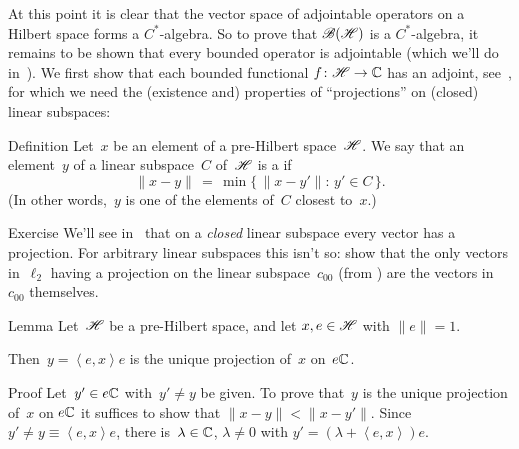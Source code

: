 \documentclass[a]{subfiles}
\begin{document}
\begin{parsec}%
\begin{point}%
At this point
it is clear that the vector space of adjointable operators
on a Hilbert space forms a $C^*$-algebra.
So to prove that $\mathscr{B}(\mathscr{H})$
is a $C^*$-algebra,
it remains to be shown that every bounded operator
is adjointable (which we'll do in~).
We first show that each bounded functional $f\colon \mathscr{H}\to \mathbb{C}$
has an adjoint, see~,
for which we need the (existence and) properties of ``projections''
on (closed) linear subspaces:
\end{point}
\begin{point}{Definition}
Let~$x$ be an element of a pre-Hilbert space~$\mathscr{H}$.
We say that an element~$y$ of a linear subspace~$C$
of~$\mathscr{H}$ is a 
if
\begin{equation*}
\|x-y\|\,=\,\min\{\,\|x-y'\|\colon \,y'\in C\,\}.
\end{equation*}
(In other words,~$y$ is one of the elements of~$C$ closest to~$x$.)
\end{point}
\begin{point}{Exercise}%
We'll see in~
that on a \emph{closed}
linear subspace
every vector has a projection.
For arbitrary linear subspaces this
isn't so:
show that the only vectors in~$\ell_2$
having 
a projection on the linear subspace~$c_{00}$
(from )
are the vectors in~$c_{00}$ themselves.
\end{point}
\begin{point}{Lemma}%
Let~$\mathscr{H}$ be a pre-Hilbert space,
and let $x,e\in\mathscr{H}$ with
$\|e\|=1$.

Then~$y=\left<e,x\right>e$ is the unique projection of~$x$ on~$e\mathbb{C}$.
\begin{point}{Proof}%
Let~$y'\in e\mathbb{C}$
with~$y'\neq y$
be given.
To prove that~$y$
is the unique projection of~$x$ on $e\mathbb{C}$
it suffices to show that $\|x-y\|<\|x-y'\|$.
Since~$y'\neq y\equiv \left<e,x\right>e$,
there is~$\lambda\in \mathbb{C}$, $\lambda\neq 0$ 
with $y'=(\lambda+\left<e,x\right>)e$.


\end{point}
\end{point}
\end{parsec}
\end{document}
